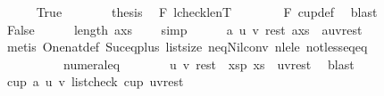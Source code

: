 \begin{isabellebody}
\ \ \ \ \isamarkupfalse%
\ True\isanewline
\ \ \ \ \isamarkupfalse%
\ \isamarkupfalse%
\ {\isacharquery}{\kern0pt}thesis\ \isamarkupfalse%
\ F{}\ lcheck{\isacharunderscore}{\kern0pt}len{}{\isacharunderscore}{\kern0pt}T\isanewline
\ \ \ \ \ \ \isamarkupfalse%
\ F{}\ cup{\isacharunderscore}{\kern0pt}def\ \isamarkupfalse%
\ blast\isanewline
\ \ \isamarkupfalse%
\isanewline
\ \ \ \ \isamarkupfalse%
\ False\isanewline
\ \ \ \ \isamarkupfalse%
\ {\isachardoublequoteopen}length\ {\isacharparenleft}{\kern0pt}a{\isacharhash}{\kern0pt}xs{\isacharparenright}{\kern0pt}\ {\isasymge}\ {}{\isachardoublequoteclose}\ \isamarkupfalse%
\ simp\isanewline
\ \ \ \ \isamarkupfalse%
\ {\isachardoublequoteopen}{\isasymexists}a\ u\ v\ rest{\isachardot}{\kern0pt}\ {\isacharparenleft}{\kern0pt}a{\isacharhash}{\kern0pt}xs{\isacharparenright}{\kern0pt}\ {\isacharequal}{\kern0pt}\ {\isacharparenleft}{\kern0pt}a{\isacharhash}{\kern0pt}u{\isacharhash}{\kern0pt}v{\isacharhash}{\kern0pt}rest{\isacharparenright}{\kern0pt}{\isachardoublequoteclose}\isanewline
\ \ \ \ \ \ \isamarkupfalse%
\ {\isacharparenleft}{\kern0pt}metis\ One{\isacharunderscore}{\kern0pt}nat{\isacharunderscore}{\kern0pt}def\ Suc{\isacharunderscore}{\kern0pt}eq{\isacharunderscore}{\kern0pt}plus{}\ list{\isachardot}{\kern0pt}size{\isacharparenleft}{\kern0pt}{}{\isacharcomma}{\kern0pt}{}{\isacharparenright}{\kern0pt}\ neq{\isacharunderscore}{\kern0pt}Nil{\isacharunderscore}{\kern0pt}conv\ nle{\isacharunderscore}{\kern0pt}le\ not{\isacharunderscore}{\kern0pt}less{\isacharunderscore}{\kern0pt}eq{\isacharunderscore}{\kern0pt}eq\isanewline
\ \ \ \ \ \ \ \ \ \ numeral{\isacharunderscore}{\kern0pt}{}{\isacharunderscore}{\kern0pt}eq{\isacharunderscore}{\kern0pt}{}{\isacharparenright}{\kern0pt}\isanewline
\ \ \ \ \isamarkupfalse%
\ \isamarkupfalse%
\ u\ v\ rest\ \ xsp{\isacharcolon}{\kern0pt}\ {\isachardoublequoteopen}xs\ {\isacharequal}{\kern0pt}\ u{\isacharhash}{\kern0pt}v{\isacharhash}{\kern0pt}rest{\isachardoublequoteclose}\ \isamarkupfalse%
\ blast\isanewline
\ \ \ \ \isamarkupfalse%
\ {\isachardoublequoteopen}cup{}\ a\ u\ v{\isachardoublequoteclose}\ {\isachardoublequoteopen}list{\isacharunderscore}{\kern0pt}check\ cup{}\ {\isacharparenleft}{\kern0pt}u{\isacharhash}{\kern0pt}v{\isacharhash}{\kern0pt}rest{\isacharparenright}{\kern0pt}{\isachardoublequoteclose}\isanewline

\end{isabellebody}
